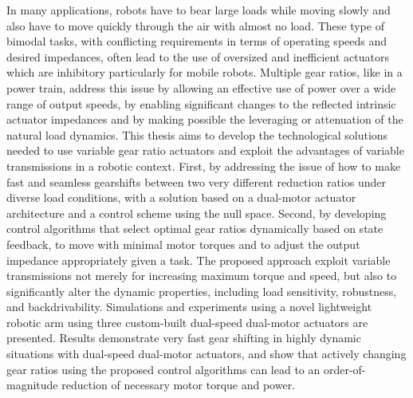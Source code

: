 In many applications, robots have to bear large loads while moving slowly and also have to move quickly through the air with almost no load. These type of bimodal tasks, with conflicting requirements in terms of operating speeds and desired impedances, often lead to the use of oversized and inefficient actuators which are inhibitory particularly for mobile robots. Multiple gear ratios, like in a power train, address this issue by allowing an effective use of power over a wide range of output speeds, by enabling significant changes to the reflected intrinsic actuator impedances and by making possible the leveraging or attenuation of the natural load dynamics. This thesis aims to develop the technological solutions needed to use variable gear ratio actuators and exploit the advantages of variable transmissions in a robotic context. First, by addressing the issue of how to make fast and seamless gearshifts between two very different reduction ratios under diverse load conditions, with a solution based on a dual-motor actuator architecture and a control scheme using the null space. Second, by developing control algorithms that select optimal gear ratios dynamically based on state feedback, to move with minimal motor torques and to adjust the output impedance appropriately given a task. The proposed approach exploit variable transmissions not merely for increasing maximum torque and speed, but also to significantly alter the dynamic properties, including load sensitivity, robustness, and backdrivability. Simulations and experiments using a novel lightweight robotic arm using three custom-built dual-speed dual-motor actuators are presented. Results demonstrate very fast gear shifting in highly dynamic situations with dual-speed dual-motor actuators, and show that actively changing gear ratios using the proposed control algorithms can lead to an order-of-magnitude reduction of necessary motor torque and power.
